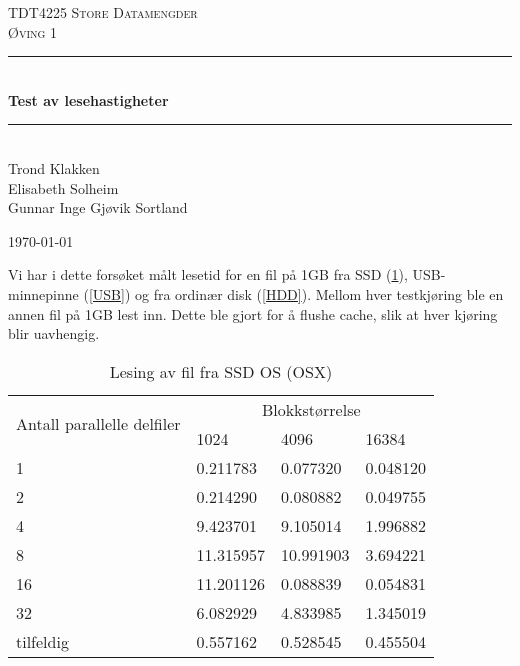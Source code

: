 \documentclass[titlepage]{article}
\newcommand{\HRule}{\rule{\linewidth}{0.5mm}}
\begin{document}
\begin{titlepage}
 
\begin{center}
 
\textsc{\LARGE TDT4225 Store Datamengder}\\[1.5cm]
\textsc{\Large Øving 1}\\[0.5cm]
 
\HRule \\[0.4cm]
{ \huge \bfseries Test av lesehastigheter}\\[0.4cm]
\HRule \\[1.5cm]

Trond Klakken \\
Elisabeth Solheim \\
Gunnar Inge Gjøvik Sortland

\vfill
 
{\large \today}
 
\end{center}

\end{titlepage}

Vi har i dette forsøket målt lesetid for en fil på 1GB fra SSD
(\ref{SSD}), USB-minnepinne (\ref{USB}) og fra ordinær disk
(\ref{HDD}). Mellom hver testkjøring ble en annen fil på 1GB lest
inn. Dette ble gjort for å flushe cache, slik at hver kjøring blir
uavhengig.

\begin{table}[h!]
\caption{Lesing av fil fra SSD OS (OSX)}
\label{SSD}
\centering
\begin{tabular}{|l|l|l|l|}
\hline
\multirow{2}{*}{ Antall parallelle delfiler} & \multicolumn{3}{|c|}{Blokkstørrelse} \\
 & 1024 & 4096 & 16384\\
\hline
1         &  0.211783  &  0.077320  & 0.048120 \\
2         &  0.214290  &  0.080882  & 0.049755 \\
4         &  9.423701  &  9.105014  & 1.996882 \\
8         & 11.315957  & 10.991903  & 3.694221 \\
16        & 11.201126  &  0.088839  & 0.054831 \\
32        &  6.082929  &  4.833985  & 1.345019 \\
tilfeldig &  0.557162  &  0.528545  & 0.455504 \\
\hline
\end{tabular}
\end{table}
\end{document}

